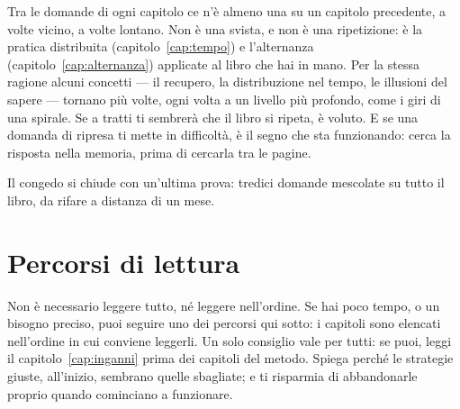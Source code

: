 Tra le domande di ogni capitolo ce n'è almeno una su un capitolo
precedente, a volte vicino, a volte lontano. Non è una svista, e non è
una ripetizione: è la pratica distribuita (capitolo~\ref{cap:tempo}) e
l'alternanza (capitolo~\ref{cap:alternanza}) applicate al libro che hai
in mano. Per la stessa ragione alcuni concetti --- il recupero, la
distribuzione nel tempo, le illusioni del sapere --- tornano più volte,
ogni volta a un livello più profondo, come i giri di una spirale. Se a
tratti ti sembrerà che il libro si ripeta, è voluto. E se una domanda
di ripresa ti mette in difficoltà, è il segno che sta funzionando:
cerca la risposta nella memoria, prima di cercarla tra le pagine.

Il congedo si chiude con un'ultima prova: tredici domande mescolate su
tutto il libro, da rifare a distanza di un mese.

\section*{Percorsi di lettura}

Non è necessario leggere tutto, né leggere nell'ordine. Se hai poco
tempo, o un bisogno preciso, puoi seguire uno dei percorsi qui sotto: i
capitoli sono elencati nell'ordine in cui conviene leggerli. Un solo
consiglio vale per tutti: se puoi, leggi il
capitolo~\ref{cap:inganni} prima dei capitoli del metodo. Spiega perché
le strategie giuste, all'inizio, sembrano quelle sbagliate; e ti
risparmia di abbandonarle proprio quando cominciano a funzionare.

